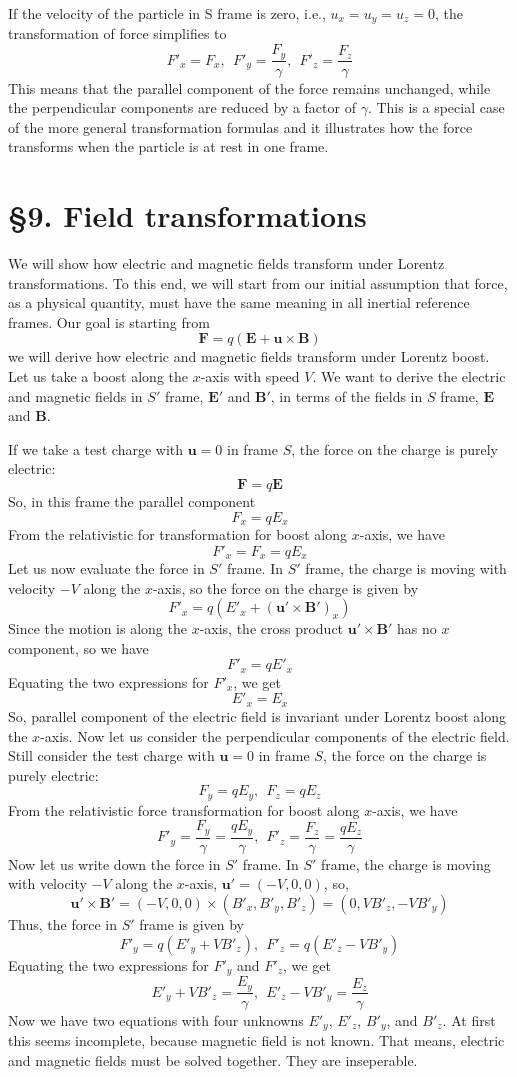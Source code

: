 \documentclass[12pt]{article}
\begin{document}
If the velocity of the particle in S frame is zero, i.e., $u_x = u_y = u_z = 0$, the transformation of force simplifies to
\[F'_x = F_x, ~~ F'_y = \frac{F_y}{\gamma}, ~~ F'_z = \frac{F_z}{\gamma}
\]
This means that the parallel component of the force remains unchanged, while the perpendicular components are reduced by a factor of $\gamma$. This is a special case of the more general transformation formulas and it illustrates how the force transforms when the particle is at rest in one frame.

\section*{§9. Field transformations}
We will show how electric and magnetic fields transform under Lorentz transformations. To this end, we will start from our initial assumption that force, as a physical quantity, must have the same meaning in all inertial reference frames. Our goal is starting from 
\[
\mathbf{F} = q(\mathbf{E} + \mathbf{u} \times \mathbf{B})
\]
we will derive how electric and magnetic fields transform under Lorentz boost. Let us take a boost along the $x$-axis with speed $V$. We want to derive the electric and magnetic fields in $S'$ frame, $\mathbf{E}'$ and $\mathbf{B}'$, in terms of the fields in $S$ frame, $\mathbf{E}$ and $\mathbf{B}$.

If we take a test charge with $\textbf{u}=0$ in frame $S$, the force on the charge is purely electric:
\[
\mathbf{F} = q\mathbf{E}
\]
So, in this frame the parallel component
\[
F_x = qE_x
\]
From the relativistic for transformation for boost along $x$-axis, we have
\[F'_x = F_x = qE_x
\]
Let us now evaluate the force in $S'$ frame. In $S'$ frame, the charge is moving with velocity $-V$ along the $x$-axis, so the force on the charge is given by
\[
F'_x = q(E'_x + (\mathbf{u}' \times \mathbf{B}')_x)
\]
Since the motion is along the $x$-axis, the cross product $\mathbf{u}' \times \mathbf{B}'$ has no $x$ component, so we have
\[
F'_x = qE'_x
\]
Equating the two expressions for $F'_x$, we get
\[
E'_x = E_x
\]
So, parallel component of the electric field is invariant under Lorentz boost along the $x$-axis. Now let us consider the perpendicular components of the electric field. Still consider the test charge with $\textbf{u}=0$ in frame $S$, the force on the charge is purely electric:
\[
F_y = qE_y, ~~ F_z = qE_z
\]From the relativistic force transformation for boost along $x$-axis, we have
\[F'_y = \frac{F_y}{\gamma} = \frac{qE_y}{\gamma}, ~~ F'_z = \frac{F_z}{\gamma} = \frac{qE_z}{\gamma}
\]
Now let us write down the force in $S'$ frame. In $S'$ frame, the charge is moving with velocity $-V$ along the $x$-axis, $\mathbf{u}'=(-V,0,0)$, so,
\[
\mathbf{u}'\times \mathbf{B}' = (-V,0,0) \times (B'_x, B'_y, B'_z) = (0, VB'_z, -VB'_y)
\]
Thus, the force in $S'$ frame is given by
\[
F'_y = q(E'_y + VB'_z), ~~ F'_z = q(E'_z - VB'_y)
\]
Equating the two expressions for $F'_y$ and $F'_z$, we get
\[
E'_y + VB'_z = \frac{E_y}{\gamma}, ~~ E'_z - VB'_y = \frac{E_z}{\gamma}
\]
Now we have two equations with four unknowns $E'_y$, $E'_z$, $B'_y$, and $B'_z$. At first this seems incomplete, because magnetic field is not known. That means, electric and magnetic fields must be solved together. They are inseperable. 
\end{document}
